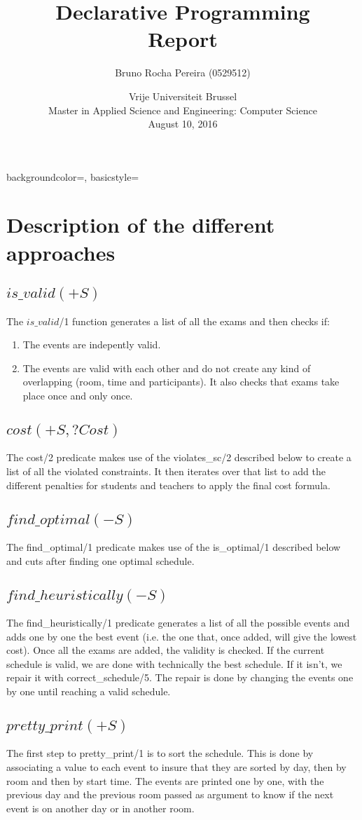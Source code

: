 \documentclass[a4paper]{article}
\title{Declarative Programming \\ Report}
\author{ Bruno Rocha Pereira (0529512)}
\date{Vrije Universiteit Brussel\\Master in Applied Science and Engineering: Computer Science\\ August 10, 2016}
\begin{document}
\maketitle
{}
{
    backgroundcolor=\color{black},
    basicstyle=\scriptsize\color{white}\ttfamily
}
\section{Description of the different approaches}
\subsection{$is\_valid(+S)$}
The $is\_valid$/1 function generates a list of all the exams and then checks if:
\begin{enumerate}
\item The events are indepently valid.
\item The events are valid with each other and do not create any kind of overlapping (room, time and participants).
It also checks that exams take place once and only once.
\end{enumerate}
\subsection{$cost(+S, ?Cost)$}
The cost/2 predicate makes use of the violates\_sc/2 described below to create a list of all the violated constraints. It then iterates over that list to add the different penalties for students and teachers to apply the final cost formula.
\subsection{$find\_optimal(-S)$}
The find\_optimal/1 predicate makes use of the is\_optimal/1 described below and cuts after finding one optimal schedule.
\subsection{$find\_heuristically(-S)$}
The find\_heuristically/1 predicate generates a list of all the possible events and adds one by one the best event (i.e. the one that, once added, will give the lowest cost). Once all the exams are added, the validity is checked. If the current schedule is valid, we are done with technically the best schedule. If it isn't, we repair it with correct\_schedule/5. The repair is done by changing the events one by one until reaching a valid schedule.
\subsection{$pretty\_print(+S)$}
The first step to pretty\_print/1 is to sort the schedule. This is done by associating a value to each event to insure that they are sorted by day, then by room and then by start time. The events are printed one by one, with the previous day and the previous room passed as argument to know if the next event is on another day or in another room.
\end{document}
